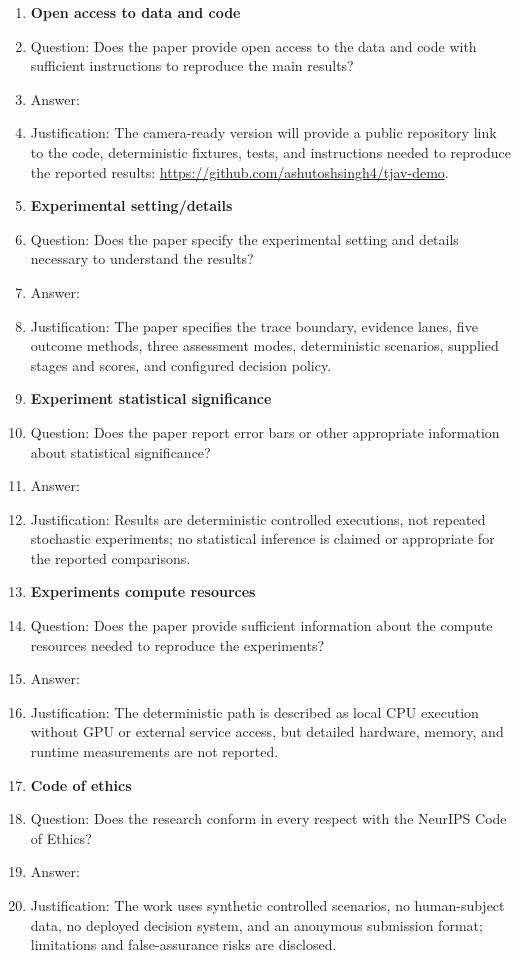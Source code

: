 \begin{enumerate}
\item {\bf Open access to data and code}
\item[] Question: Does the paper provide open access to the data and code with sufficient instructions to reproduce the main results?
\item[] Answer: \answerYes{}
\item[] Justification: The camera-ready version will provide a public repository link to the code, deterministic fixtures, tests, and instructions needed to reproduce the reported results: \url{https://github.com/ashutoshsingh4/tjav-demo}.

\item {\bf Experimental setting/details}
\item[] Question: Does the paper specify the experimental setting and details necessary to understand the results?
\item[] Answer: \answerYes{}
\item[] Justification: The paper specifies the trace boundary, evidence lanes, five outcome methods, three assessment modes, deterministic scenarios, supplied stages and scores, and configured decision policy.

\item {\bf Experiment statistical significance}
\item[] Question: Does the paper report error bars or other appropriate information about statistical significance?
\item[] Answer: \answerNo{}
\item[] Justification: Results are deterministic controlled executions, not repeated stochastic experiments; no statistical inference is claimed or appropriate for the reported comparisons.

\item {\bf Experiments compute resources}
\item[] Question: Does the paper provide sufficient information about the compute resources needed to reproduce the experiments?
\item[] Answer: \answerNo{}
\item[] Justification: The deterministic path is described as local CPU execution without GPU or external service access, but detailed hardware, memory, and runtime measurements are not reported.

\item {\bf Code of ethics}
\item[] Question: Does the research conform in every respect with the NeurIPS Code of Ethics?
\item[] Answer: \answerYes{}
\item[] Justification: The work uses synthetic controlled scenarios, no human-subject data, no deployed decision system, and an anonymous submission format; limitations and false-assurance risks are disclosed.


\end{enumerate}
